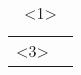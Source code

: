 \begin{table}[h]
\centering
\caption{<1>}
\label{<2>}
\begin{tabular}{|ll|}
\hline
<3>
\hline
\end{tabular}
\end{table}